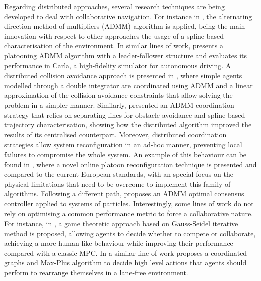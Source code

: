 \documentclass[letterpaper, 10 pt, conference]{ieeeconf}  %
\begin{document}
Regarding distributed approaches, several research techniques are being developed to deal with collaborative navigation. For instance in \cite{DistriADMM}, the alternating direction method of multipliers (ADMM) algorithm is applied, being the main innovation with respect to other approaches the usage of a spline based characterisation of the environment. In similar lines of work, \cite{Vlachos2022} presents a platooning ADMM algorithm with a leader-follower structure and evaluates its performance in Carla, a high-fidelity simulator for autonomous driving. A distributed collision avoidance approach is presented in \cite{8550245}, where simple agents modelled through a double integrator are coordinated using ADMM and a linear approximation of the collision avoidance constraints that allow solving the problem in a simpler manner. Similarly, \cite{van2016online} presented an ADMM coordination strategy that relies on separating lines for obstacle avoidance and spline-based trajectory characterisation, showing how the distributed algorithm improved the results of its centralised counterpart. Moreover, distributed coordination strategies allow system reconfiguration in an ad-hoc manner, preventing local failures to compromise the whole system. An example of this behaviour can be found in \cite{adHoc2021}, where a novel online platoon reconfiguration technique is presented and compared to the current European standards, with an special focus on the physical limitations that need to be overcome to implement this family of algorithms. Following a different path, \cite{8648233} proposes an ADMM optimal consensus controller applied to systems of particles. Interestingly, some lines of work do not rely on optimising a common performance metric to force a collaborative nature. For instance, in \cite{Wang2015}, a game theoretic approach based on Gauss-Seidel iterative method is proposed, allowing agents to decide whether to compete or collaborate, achieving a more human-like behaviour while improving their performance compared with a classic MPC. In a similar line of work \cite{troullinos2021collaborative} proposes a coordinated graphs and Max-Plus algorithm to decide high level actions that agents should perform to rearrange themselves in a lane-free environment.
\end{document}
